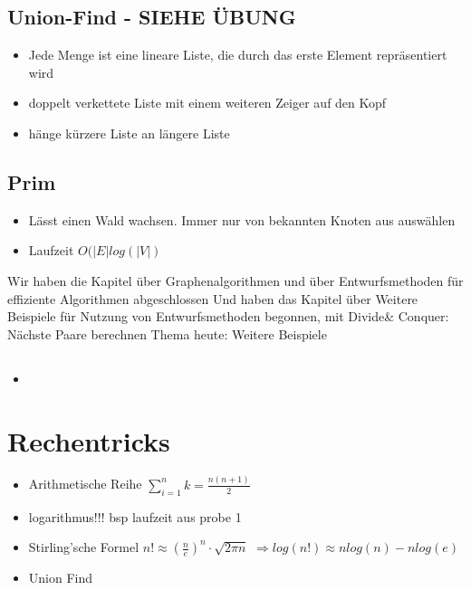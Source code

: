 \documentclass{article}
\begin{document}
\subsection{Union-Find - SIEHE ÜBUNG}
\begin{itemize}
\item Jede Menge ist eine lineare Liste, die durch das erste Element repräsentiert wird
\item doppelt verkettete Liste mit einem weiteren Zeiger auf den Kopf
\item hänge kürzere Liste an längere Liste
\end{itemize}

\subsection{Prim}
\begin{itemize}
\item Lässt einen Wald wachsen. Immer nur von bekannten Knoten aus auswählen
\item  Laufzeit $O(|E| log(|V|)$
\end{itemize}





Wir haben die Kapitel über Graphenalgorithmen und über Entwurfsmethoden für effiziente Algorithmen abgeschlossen Und haben das 
Kapitel über Weitere Beispiele für Nutzung von Entwurfsmethoden begonnen, mit Divide& Conquer: Nächste Paare berechnen Thema heute: Weitere Beispiele


\subsection{}
\begin{itemize}
\item
\end{itemize}



\section{Rechentricks}
\begin{itemize}
\item Arithmetische Reihe $\sum_{i=1}^n k  = \frac{n(n+1)}{2} $
\item logarithmus!!! bsp laufzeit aus probe 1
\item Stirling'sche Formel $n! \approx (\frac{n}{e})^n \cdot \sqrt{2\pi n}$ \newline
$ \Rightarrow  log(n!) \approx nlog(n)-nlog(e)$

\item Union Find

\end{itemize}
\end{document}
